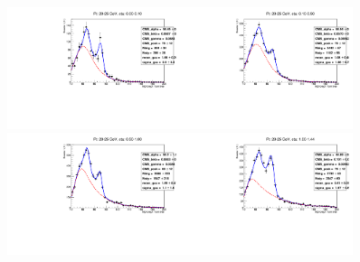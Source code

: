 \begin{figure}[htb]
  \begin{center}
   \includegraphics[width=0.45\textwidth]{../figs/figs_v11/ELECTRON_WGamma/EtoGammaFits/sa_hZmass_h_Data_EtoGamma_Enr_BARREL_pt20to25_ieta0.pdf}\includegraphics[width=0.45\textwidth]{../figs/figs_v11/ELECTRON_WGamma/EtoGammaFits/sa_hZmass_h_Data_EtoGamma_Enr_BARREL_pt20to25_ieta1.pdf}\\
   \includegraphics[width=0.45\textwidth]{../figs/figs_v11/ELECTRON_WGamma/EtoGammaFits/sa_hZmass_h_Data_EtoGamma_Enr_BARREL_pt20to25_ieta2.pdf}\includegraphics[width=0.45\textwidth]{../figs/figs_v11/ELECTRON_WGamma/EtoGammaFits/sa_hZmass_h_Data_EtoGamma_Enr_BARREL_pt20to25_ieta3.pdf}\\

\end{center}
\end{figure}
